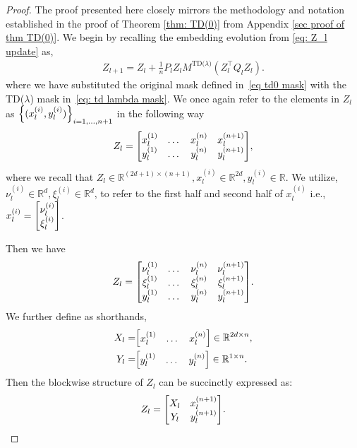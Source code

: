 \documentclass{article}
\newcommand{\R}{\mathbb{R}}
\newcommand{\tdlambda}{\text{TD($\lambda$)}}
\begin{document}
\begin{proof}
    The proof presented here closely mirrors the methodology and notation established in the proof of Theorem \ref{thm: TD(0)} from Appendix \ref{sec proof of thm TD(0)}. We begin by recalling the embedding evolution from \eqref{eq: Z_l update} as,
    \begin{align}
        Z_{l+1} = Z_l + \frac{1}{n} P_l Z_l M^\tdlambda(Z_l^\top Q_l Z_l).
    \end{align}
    where we have substituted the original mask defined in~\eqref{eq td0 mask} with the TD($\lambda$) mask in~\eqref{eq: td lambda mask}.
    We once again refer to the elements in $Z_l$ as $\qty{(x^{(i)}_l, y^{(i)}_l)}_{i=1,\dots, n+1}$ in the following way
    \begin{align}
        Z_l = \mqty[x_l^{(1)} & \dots & x_l^{(n)} & x_l^{(n+1)} \\ y_l^{(1)} & \dots & y_l^{(n)} & y_l^{(n+1)}],
    \end{align}
    where we recall that $Z_l \in \R^{(2d + 1) \times (n+1)}, x_l^{(i)} \in \R^{2d}, y^{(i)}_l \in \R$.
    We utilize, $\nu^{(i)}_l \in \R^d, \xi_l^{(i)} \in \R^d$, to refer to the first half and second half of $x_l^{(i)}$ i.e., $x_l^{(i)} = \mqty[\nu_l^{(i)} \\ \xi_l^{(i)}]$.
    
    Then we have
    \begin{align}
        Z_l = \mqty[\nu_l^{(1)} & \dots & \nu_l^{(n)} & \nu_l^{(n+1)} \\
        \xi_l^{(1)} & \dots & \xi_l^{(n)} & \xi_l^{(n+1)} \\
         y_l^{(1)} & \dots & y_l^{(n)} & y_l^{(n+1)}].
    \end{align}
    We further define as shorthands,
    \begin{align}
        X_l =& \mqty[x_l^{(1)} & \dots & x_l^{(n)}] \in \R^{2d \times n}, \\
        Y_l =&  \mqty[y_l^{(1)} & \dots & y_l^{(n)}] \in \R^{1 \times n}.
    \end{align}
    Then the blockwise structure of $Z_l$ can be succinctly expressed as:
    \begin{align}
        Z_l = \mqty[X_l & x_l^{(n+1)} \\ Y_l & y_l^{(n+1)}]. \label{eq: z_l blockwise X Y lambda}
    \end{align}


\end{proof}
\end{document}
